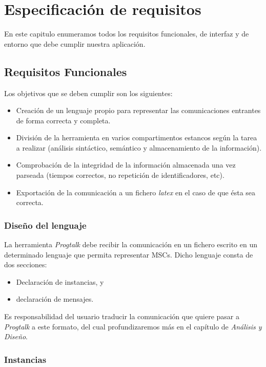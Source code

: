 \documentclass[12pt,a4paper]{report}
\begin{document}
\chapter{Especificación de requisitos}

En este capitulo enumeramos todos los requisitos funcionales, de interfaz y de entorno que debe cumplir nuestra aplicación.

\section{Requisitos Funcionales}

Los objetivos que se deben cumplir son los siguientes:

\begin{itemize}
\item Creación de un lenguaje propio para representar las comunicaciones entrantes de forma correcta y completa.
\item División de la herramienta en varios compartimentos estancos según la tarea a realizar (análisis sintáctico, semántico y almacenamiento de la información).
\item Comprobación de la integridad de la información almacenada una vez parseada (tiempos correctos, no repetición de identificadores, etc).
\item Exportación de la comunicación a un fichero \textit{latex} en el caso de que ésta sea correcta.
\end{itemize}

\subsection{Diseño del lenguaje}

La herramienta \textit{Progtalk} debe recibir la comunicación en un fichero escrito en un determinado lenguaje que permita representar MSCs. Dicho lenguaje consta de dos secciones:
\begin{itemize}
\item Declaración de instancias, y
\item declaración de mensajes.
\end{itemize}

Es responsabilidad del usuario traducir la comunicación que quiere pasar a \textit{Progtalk} a este formato, del cual profundizaremos más en el capítulo de \textit{Análisis y Diseño}.

\subsection{Instancias}
\end{document}
